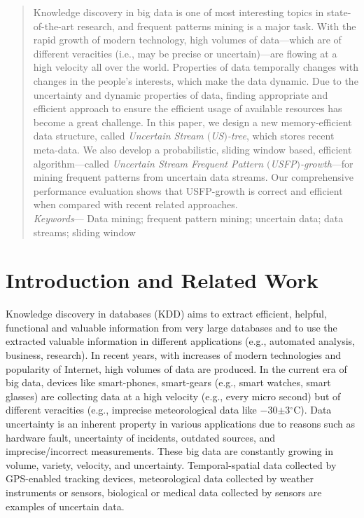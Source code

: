 \documentclass[10pt, conference, compsocconf]{IEEEtran}
\begin{document}
\begin{abstract}
Knowledge discovery in big data is one of most interesting topics in state-of-the-art research, and frequent patterns mining is a major task. With the rapid growth of modern technology, high volumes of data---which are of different veracities (i.e., may be precise or uncertain)---are flowing at a high velocity all over the world. Properties of data temporally changes with changes in the people's interests, which make the data dynamic. Due to the uncertainty and dynamic properties of data, finding appropriate and efficient approach to ensure the efficient usage of available resources has become a great challenge. In this paper, we design a new memory-efficient data structure, called {\em Uncertain Stream $($US$)$-tree}, which stores recent meta-data. We also develop a probabilistic, sliding window based, efficient algorithm---called {\em Uncertain Stream Frequent Pattern $($USFP$)$-growth}---for mining frequent patterns from uncertain data streams. Our comprehensive performance evaluation shows that USFP-growth is correct and efficient when compared with recent related approaches.\\[-5pt]

\textit{Keywords}---
Data mining; frequent pattern mining; uncertain data; data streams; sliding window
\end{abstract}


\section{Introduction and Related Work}\label{Related_work}

Knowledge discovery in databases (KDD) aims to extract efficient, helpful, functional and valuable information from very large databases and to use the extracted valuable information in different applications (e.g., automated analysis, business, research). In recent years, with increases of modern technologies and popularity of Internet, high volumes of data are produced.
In the current era of big data, devices like smart-phones, smart-gears (e.g., smart watches, smart glasses) are collecting data at a high velocity (e.g., every micro second) but of different veracities (e.g., imprecise meteorological data like $-$30$\pm$3$^\circ$C).
Data uncertainty is an inherent property in various applications due to reasons such as hardware fault, uncertainty of incidents, outdated sources, and imprecise/incorrect measurements. These big data are constantly growing in volume, variety, velocity, and uncertainty. Temporal-spatial data collected by GPS-enabled tracking devices, meteorological data collected by weather instruments or sensors, biological or medical data collected by sensors are examples of uncertain data.
\end{document}
